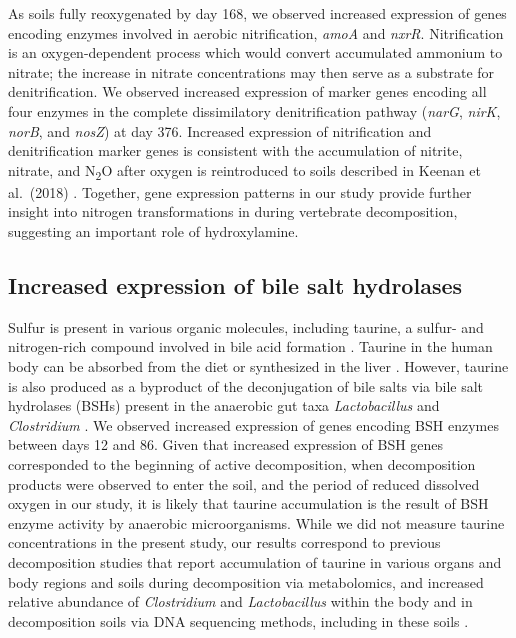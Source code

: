 \documentclass[
  sn-nature,
  lineno, referee]{sn-jnl}
\begin{document}
As soils fully reoxygenated by day 168, we observed increased expression
of genes encoding enzymes involved in aerobic nitrification, \emph{amoA}
and \emph{nxrR}. Nitrification is an oxygen-dependent process which
would convert accumulated ammonium to nitrate; the increase in nitrate
concentrations may then serve as a substrate for denitrification. We
observed increased expression of marker genes encoding all four enzymes
in the complete dissimilatory denitrification pathway (\emph{narG},
\emph{nirK}, \emph{norB}, and \emph{nosZ}) at day 376. Increased
expression of nitrification and denitrification marker genes is
consistent with the accumulation of nitrite, nitrate, and
N\textsubscript{2}O after oxygen is reintroduced to soils described in
Keenan et al.~(2018)
\citep{keenan_mortality_2018, debruyn_carrion_2024}. Together, gene
expression patterns in our study provide further insight into nitrogen
transformations in during vertebrate decomposition, suggesting an
important role of hydroxylamine.

\subsection{Increased expression of bile salt
hydrolases}\label{increased-expression-of-bile-salt-hydrolases}

Sulfur is present in various organic molecules, including taurine, a
sulfur- and nitrogen-rich compound involved in bile acid formation
\citep{urdaneta_interactions_2017}. Taurine in the human body can be
absorbed from the diet or synthesized in the liver
\citep{seidel_taurine_2019}. However, taurine is also produced as a
byproduct of the deconjugation of bile salts via bile salt hydrolases
(BSHs) present in the anaerobic gut taxa \emph{Lactobacillus} and
\emph{Clostridium} \citep{urdaneta_interactions_2017}. We observed
increased expression of genes encoding BSH enzymes between days 12 and
86. Given that increased expression of BSH genes corresponded to the
beginning of active decomposition, when decomposition products were
observed to enter the soil, and the period of reduced dissolved oxygen
in our study, it is likely that taurine accumulation is the result of
BSH enzyme activity by anaerobic microorganisms. While we did not
measure taurine concentrations in the present study, our results
correspond to previous decomposition studies that report accumulation of
taurine in various organs and body regions
\citep{mora-ortiz_thanatometabolomics_2019, locci_1h_2019, zelentsova_post-mortem_2016}
and soils
\citep{debruyn_comparative_2021, hoeland_katharina_investigating_2021}
during decomposition via metabolomics, and increased relative abundance
of \emph{Clostridium }and \emph{Lactobacillus} within the body
\citep{javan_human_2016, javan_cadaver_2017, debruyn_postmortem_2017}
and in decomposition soils \citep{cobaugh_functional_2015} via DNA
sequencing methods, including in these soils
\citep{taylor_transient_2024}.
\end{document}
